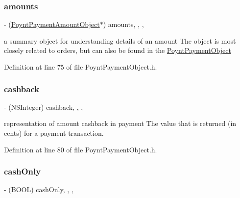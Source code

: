 \subsubsection{\texorpdfstring{amounts}{amounts}}
{\footnotesize\ttfamily -\/ (\hyperlink{interface_poynt_payment_amount_object}{Poynt\+Payment\+Amount\+Object}$\ast$) amounts\hspace{0.3cm}{\ttfamily [read]}, {\ttfamily [write]}, {\ttfamily [nonatomic]}, {\ttfamily [strong]}}



a summary object for understanding details of an amount  The object is most closely related to orders, but can also be found in the \hyperlink{interface_poynt_payment_object}{Poynt\+Payment\+Object} 



Definition at line 75 of file Poynt\+Payment\+Object.\+h.

\hypertarget{interface_poynt_payment_object_a84de6fd790c3129d6d0a271d915d442a}{}\label{interface_poynt_payment_object_a84de6fd790c3129d6d0a271d915d442a} 
\subsubsection{\texorpdfstring{cashback}{cashback}}
{\footnotesize\ttfamily -\/ (N\+S\+Integer) cashback\hspace{0.3cm}{\ttfamily [read]}, {\ttfamily [write]}, {\ttfamily [nonatomic]}, {\ttfamily [assign]}}



representation of amount cashback in payment  The value that is returned (in cents) for a payment transaction. 



Definition at line 80 of file Poynt\+Payment\+Object.\+h.

\hypertarget{interface_poynt_payment_object_a7b74d30854a9218712b55c79cd7786f0}{}\label{interface_poynt_payment_object_a7b74d30854a9218712b55c79cd7786f0} 
\subsubsection{\texorpdfstring{cash\+Only}{cashOnly}}
{\footnotesize\ttfamily -\/ (B\+O\+OL) cash\+Only\hspace{0.3cm}{\ttfamily [read]}, {\ttfamily [write]}, {\ttfamily [nonatomic]}, {\ttfamily [assign]}}



